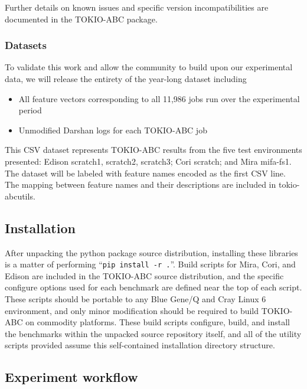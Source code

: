 Further details on known issues and specific version incompatibilities are documented in the TOKIO-ABC package.

\subsubsection{Datasets}

To validate this work and allow the community to build upon our experimental data, we will release the entirety of the year-long dataset including

\begin{itemize}
\item All feature vectors corresponding to all 11,986 jobs run over the experimental period
\item Unmodified Darshan logs for each TOKIO-ABC job
\end{itemize}

This CSV dataset represents TOKIO-ABC results from the five test environments presented:
Edison scratch1, scratch2, scratch3; Cori scratch; and Mira mifa-fs1.
The dataset will be labeled with feature names encoded as the first CSV line.
The mapping between feature names and their descriptions are included in tokio-abcutils.

\subsection{Installation}

After unpacking the python package source distribution, installing these libraries is a matter of performing ``\texttt{{pip install -r .}}''.
Build scripts for Mira, Cori, and Edison are included in the TOKIO-ABC source distribution, and the specific configure options used for each benchmark are defined near the top of each script.
These scripts should be portable to any Blue Gene/Q and Cray Linux 6 environment, and only minor modification should be required to build TOKIO-ABC on commodity platforms.
These build scripts configure, build, and install the benchmarks within the unpacked source repository itself, and all of the utility scripts provided assume this self-contained installation directory structure.

\subsection{Experiment workflow}

